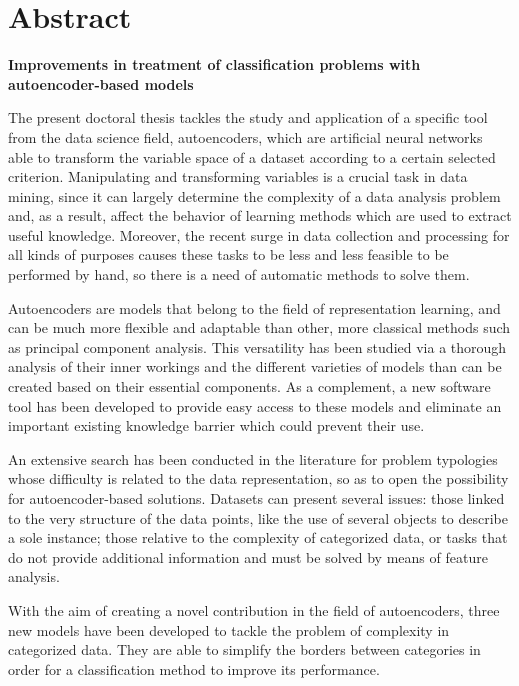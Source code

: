 \chapter*{Abstract}

\begin{center}
\textbf{Improvements in treatment of classification problems with autoencoder-based models}
\end{center}

The present doctoral thesis tackles the study and application of a specific tool from the data science field, autoencoders, which are artificial neural networks able to transform the variable space of a dataset according to a certain selected criterion. Manipulating and transforming variables is a crucial task in data mining, since it can largely determine the complexity of a data analysis problem and, as a result, affect the behavior of learning methods which are used to extract useful knowledge. Moreover, the recent surge in data collection and processing for all kinds of purposes causes these tasks to be less and less feasible to be performed by hand, so there is a need of automatic methods to solve them.

Autoencoders are models that belong to the field of representation learning, and can be much more flexible and adaptable than other, more classical methods such as principal component analysis. This versatility has been studied via a thorough analysis of their inner workings and the different varieties of models than can be created based on their essential components. As a complement, a new software tool has been developed to provide easy access to these models and eliminate an important existing knowledge barrier which could prevent their use.

An extensive search has been conducted in the literature for problem typologies whose difficulty is related to the data representation, so as to open the possibility for autoencoder-based solutions. Datasets can present several issues: those linked to the very structure of the data points, like the use of several objects to describe a sole instance; those relative to the complexity of categorized data, or tasks that do not provide additional information and must be solved by means of feature analysis.

With the aim of creating a novel contribution in the field of autoencoders, three new models have been developed to tackle the problem of complexity in categorized data. They are able to simplify the borders between categories in order for a classification method to improve its performance.

